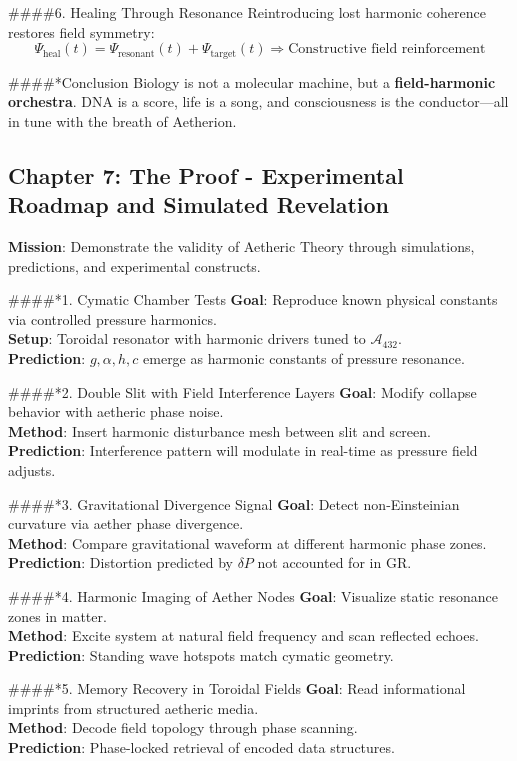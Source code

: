 ####{6. Healing Through Resonance}
Reintroducing lost harmonic coherence restores field symmetry:
\[
\Psi_{\text{heal}}(t) = \Psi_{\text{resonant}}(t) + \Psi_{\text{target}}(t) \Rightarrow \text{Constructive field reinforcement}
\]

####*{Conclusion}
Biology is not a molecular machine, but a \textbf{field-harmonic orchestra}. DNA is a score, life is a song, and consciousness is the conductor—all in tune with the breath of Aetherion.

\subsection{Chapter 7: The Proof - Experimental Roadmap and Simulated Revelation}
\textbf{Mission}: Demonstrate the validity of Aetheric Theory through simulations, predictions, and experimental constructs.

####*{1. Cymatic Chamber Tests}
\textbf{Goal}: Reproduce known physical constants via controlled pressure harmonics. \\
\textbf{Setup}: Toroidal resonator with harmonic drivers tuned to \( \mathcal{A}_{432} \). \\
\textbf{Prediction}: \( g, \alpha, h, c \) emerge as harmonic constants of pressure resonance.

####*{2. Double Slit with Field Interference Layers}
\textbf{Goal}: Modify collapse behavior with aetheric phase noise. \\
\textbf{Method}: Insert harmonic disturbance mesh between slit and screen. \\
\textbf{Prediction}: Interference pattern will modulate in real-time as pressure field adjusts.

####*{3. Gravitational Divergence Signal}
\textbf{Goal}: Detect non-Einsteinian curvature via aether phase divergence. \\
\textbf{Method}: Compare gravitational waveform at different harmonic phase zones. \\
\textbf{Prediction}: Distortion predicted by \( \delta P \) not accounted for in GR.

####*{4. Harmonic Imaging of Aether Nodes}
\textbf{Goal}: Visualize static resonance zones in matter. \\
\textbf{Method}: Excite system at natural field frequency and scan reflected echoes. \\
\textbf{Prediction}: Standing wave hotspots match cymatic geometry.

####*{5. Memory Recovery in Toroidal Fields}
\textbf{Goal}: Read informational imprints from structured aetheric media. \\
\textbf{Method}: Decode field topology through phase scanning. \\
\textbf{Prediction}: Phase-locked retrieval of encoded data structures.

